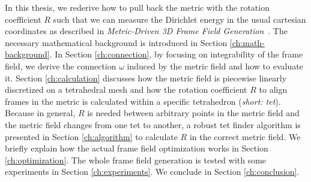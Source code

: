 \documentclass[../thesis.tex]{subfiles}
\begin{document}
In this thesis, we rederive how to pull back the metric with the rotation coefficient $R$ such that we can measure
the Dirichlet energy in the usual cartesian coordinates as described in \emph{Metric-Driven 3D Frame Field Generation}~\cite{Fang23}.
The necessary mathematical background is introduced in Section \ref{ch:math-background}.
In Section \ref{ch:connection}, by focusing on integrability of the frame field,
we derive the connection $\omega$ induced by the metric field and how to evaluate it.
Section \ref{ch:calculation} discusses how the metric field is piecewise linearly discretized on a tetrahedral
mesh and how the rotation coefficient $R$ to align frames in the metric is calculated within a specific tetrahedron (\emph{short: tet}).
Because in general, $R$ is needed between arbitrary points in the metric field and the metric field
changes from one tet to another, a robust tet finder algorithm is
presented in Section \ref{ch:algorithm} to calculate $R$ in the correct metric field.
We briefly explain how the actual frame field optimization works in Section \ref{ch:optimization}.
The whole frame field generation is tested with some experiments in Section \ref{ch:experiments}.
We conclude in Section \ref{ch:conclusion}.
\end{document}
